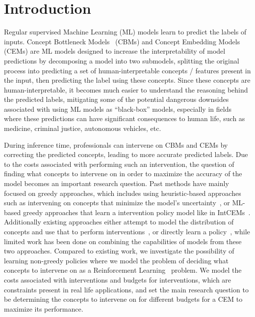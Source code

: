 \documentclass[../main.tex]{subfiles}
\begin{document}
\chapter{Introduction}
\label{firstcontentpage}


Regular supervised Machine Learning (ML) models learn to 
predict the labels of inputs.
Concept Bottleneck Models~\cite{cbm} (CBMs) and Concept Embedding Models~\cite{cem} (CEMs) are 
ML models designed to increase the interpretability of model predictions by decomposing a model into
two submodels, splitting the original process into predicting a set of human-interpretable
concepts / features present in the input, then predicting the label using these concepts.
Since these concepts are human-interpretable, it becomes much easier to understand
the reasoning behind the predicted labels, mitigating some of the
potential dangerous downsides associated with using ML models as ``black-box'' models,
especially in fields where these predictions can have significant consequences to
human life, such as medicine, criminal justice, autonomous vehicles, etc. 

During inference time, professionals can intervene on CBMs and CEMs by correcting
the predicted concepts, leading to more accurate predicted labels. 
Due to the costs
associated with performing such an intervention, the question of finding what concepts
to intervene on in order to maximize the accuracy of the model becomes an important 
research question. Past methods have mainly focused on greedy approaches, which
includes using heuristic-based approaches such as intervening on concepts that minimize the
model's uncertainty~\cite{coop}, or ML-based greedy approaches that learn a intervention policy model
like in IntCEMs~\cite{intcem}. Additionally existing approaches either 
attempt to model the distribution of concepts and use that to perform interventions~\cite{energycem}, 
or directly learn a policy~\cite{intcem}, while limited
work has been done on combining the capabilities of models from these two approaches.
Compared to existing work, we investigate the possibility of learning non-greedy policies
where we model the problem of deciding what concepts to intervene on as a Reinforcement Learning~\cite{rl} 
problem. We model the costs
associated with interventions and budgets for interventions, which are constraints present in
 real life
applications, and set the main research question to be
determining the concepts to intervene on for different budgets for a CEM
to maximize its performance.
\end{document}
